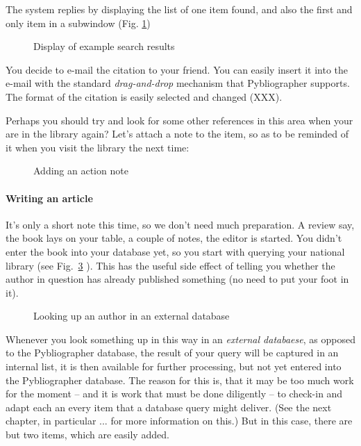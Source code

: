The system replies by displaying the list of one item found, and also
the first and only item in a subwindow (Fig. \ref{fig:searchx2})

\begin{figure}[h]
  
  \caption{Display of example search results}
  \label{fig:searchx2}
\end{figure}

You decide to e-mail the citation to your friend. You can easily
insert it into the e-mail with the standard \textit{drag-and-drop}
mechanism that Pybliographer supports. The format of the citation is
easily selected and changed (XXX).

Perhaps you should try and look for some other references in this area
when your are in the library again? Let's attach a note to the item,
so as to be reminded of it when you visit the library the next time: 

\begin{figure}[h]
  
  \caption{Adding an action note}
  \label{fig:searchx3}
\end{figure}


\paragraph{Writing an article}

\label{sec:writing-an-article}

It's only a short note this time, so we don't need much preparation. A
review say, the book lays on your table, a couple of notes, the editor
is started. You didn't enter the book into your database yet, so you
start with querying your national library (see Fig.~\ref{fig:searchx4}
). This has the useful side effect of telling you whether the author
in question has already published something (no need to put your foot
in it).

\begin{figure}[h]
  
  \caption{Looking up an author in an external database}
  \label{fig:searchx4}
\end{figure}

Whenever you look something up in this way in an \textit{external
  databaese}, as opposed to the Pybliographer database, the result of
your query will be captured in an internal list, it is then available
for further processing, but not yet entered into the Pybliographer
database. The reason for this is, that it may be too much work for the
moment -- and it is work that must be done diligently -- to check-in
and adapt each an every item that a database query might deliver. (See
the next chapter, in particular ... for more information on this.)
But in this case, there are but two items, which are easily added.

